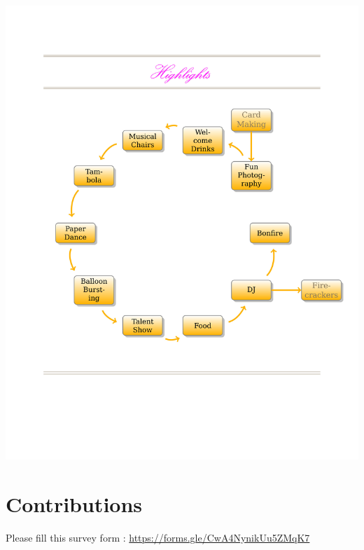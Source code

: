 \documentclass[makeidx, 11pt, oneside, onecolumn, openright, final, svgnames, dvipsnames, extrafontsizes]{memoir}
\begin{document}
\begin{center}
\includegraphics[scale=1]{highlights.jpeg}
\end{center}






\renewcommand{\contentsname}{Fun Events}

\tableofcontents*


\chapter*{Contributions}

Please fill this survey form :
\url{https://forms.gle/CwA4NynikUu5ZMqK7}
\end{document}
